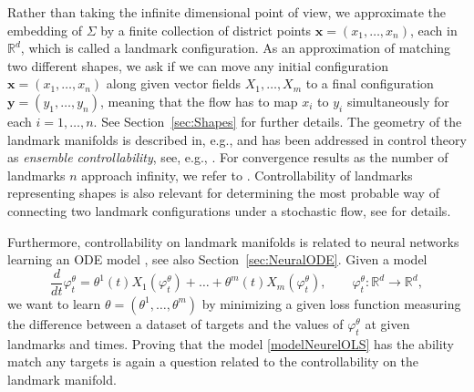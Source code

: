 \documentclass[10pt]{amsart}
\theoremstyle{remark}
\numberwithin{equation}{section}
\begin{document}
Rather than taking the infinite dimensional point of view, we approximate the embedding of $\Sigma$ by a finite collection of district points $\mathbf{x} = (x_1, \dots, x_n)$, each in $\mathbb{R}^d$, which is called a landmark configuration. As an approximation of matching two different shapes, we ask if we can move any initial configuration $\mathbf{x} = (x_1, \dots, x_n)$ along given vector fields $X_1, \dots, X_m$ to a final configuration $\mathbf{y} = (y_1, \dots, y_n)$, meaning that the flow has to map $x_i$ to $y_i$ simultaneously for each $i=1, \dots,n$. See Section~\ref{sec:Shapes} for further details. The geometry of the landmark manifolds is described in, e.g., \cite{Younes-2010,MicheliMichorMumford-2012,Arnaudon-2018} and has been addressed in control theory as \emph{ensemble controllability}, see, e.g., \cite{ABS16,Che19}.
For convergence results as the number of landmarks $n$ approach infinity, we refer to \cite{HMPS23}.
Controllability of landmarks representing shapes is also relevant for determining the most probable way of connecting two landmark configurations under a stochastic flow, see \cite[Section~6]{GrongSommer-2022} for details.


Furthermore, controllability on landmark manifolds is related to neural networks learning an ODE model \cite{ChenNeurIPS,Ruiz-Balet,ALVAREZLOPEZ2024106640,ChengControl}, see also Section~\ref{sec:NeuralODE}. Given a model
\begin{equation} \label{modelNeurelOLS} \frac{d}{dt} \varphi_t^{\theta} = \theta^1(t)X_1(\varphi_t^\theta) + \dots +\theta^m(t) X_m(\varphi_t^\theta), \qquad \varphi_t^\theta: \mathbb{R}^d \to \mathbb{R}^d,\end{equation}
we want to learn $\theta = (\theta^1, \dots, \theta^m)$ by minimizing a given loss function measuring the difference between a dataset of targets and the values of $\varphi_{t}^{\theta}$ at given landmarks and times. Proving that the model \eqref{modelNeurelOLS} has the ability match any targets is again a question related to the controllability on the landmark manifold.
\end{document}
